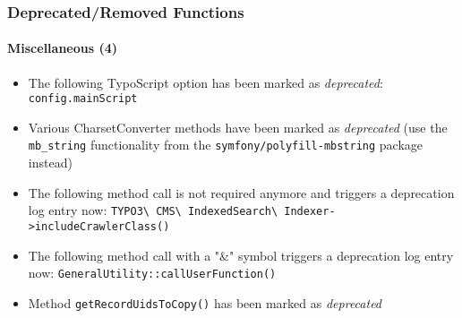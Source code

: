 \begin{frame}[fragile]
	\frametitle{Deprecated/Removed Functions}
	\framesubtitle{Miscellaneous (4)}


	\begin{itemize}

		\item The following TypoScript option has been marked as \textit{deprecated}:\newline
			\texttt{config.mainScript}

		\item Various CharsetConverter methods have been marked as \textit{deprecated}\newline
			\small
				(use the \texttt{mb\_string} functionality from the \texttt{symfony/polyfill-mbstring}
				package instead)
			\normalsize

		\item The following method call is not required anymore and triggers a deprecation log entry now:
			\small\texttt{TYPO3\textbackslash
				CMS\textbackslash
				IndexedSearch\textbackslash
				Indexer->includeCrawlerClass()}
			\normalsize

		\item The following method call with a "\&" symbol triggers a deprecation log entry now:
			\small\texttt{GeneralUtility::callUserFunction()}\normalsize

		\item Method \texttt{getRecordUidsToCopy()} has been marked as \textit{deprecated}

	\end{itemize}

\end{frame}









